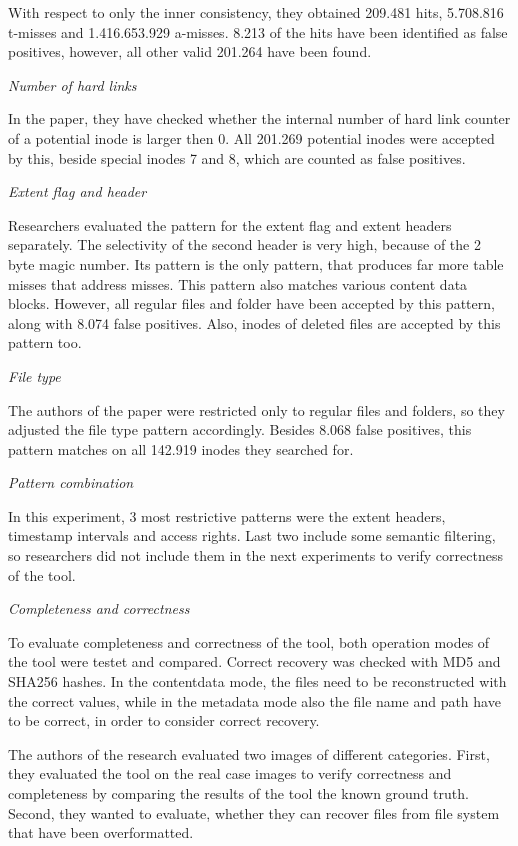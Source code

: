 \documentclass{acm_proc_article-sp}
\begin{document}
With respect to only the inner consistency, they obtained 209.481 hits, 5.708.816 t-misses and 1.416.653.929 a-misses. 8.213 of the hits have been identified as false positives, however, all other valid 201.264 have been found.

\textit{Number of hard links}

In the paper, they have checked whether the internal number of hard link counter of a potential inode is larger then 0. All 201.269 potential inodes were accepted by this, beside special inodes 7 and 8, which are counted as false positives.

\textit{Extent flag and header}

Researchers evaluated the pattern for the extent flag and extent headers separately. The selectivity of the second header is very high, because of the 2 byte magic number. Its pattern is the only pattern, that produces far more table misses that address misses. This pattern also matches various content data blocks. However, all regular files and folder have been accepted by this pattern, along with 8.074 false positives. 
Also, inodes of deleted files are accepted by this pattern too. 

\textit{File type}

The authors of the paper were restricted only to regular files and folders, so they adjusted the file type pattern accordingly. Besides 8.068 false positives, this pattern matches on all 142.919 inodes they searched for.

\textit{Pattern combination}

In this experiment, 3 most restrictive patterns were the extent headers, timestamp intervals and access rights. Last two include some semantic filtering, so researchers did not include them in the next experiments to verify correctness of the tool.

\textit{Completeness and correctness}

To evaluate completeness and correctness of the tool, both operation modes of the tool were testet and compared. Correct recovery was checked with MD5 and SHA256 hashes. In the contentdata mode, the files need to be reconstructed with the correct values, while in the metadata mode also the file name and path have to be correct, in order to consider correct recovery.

The authors of the research evaluated two images of different categories. First, they evaluated the tool on the real case images to verify correctness and completeness by comparing the results of the tool the known ground truth. Second, they wanted to evaluate, whether they can recover files from file system that have been overformatted.
\end{document}
